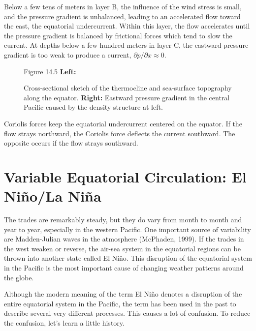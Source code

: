 Below a few tens of meters in layer B, the influence of the wind
stress is small, and the pressure gradient is unbalanced, leading to
an accelerated flow toward the east, the equatorial
undercurrent. Within this layer, the flow accelerates until the
pressure gradient is balanced by frictional forces which tend to slow
the current. At depths below a few hundred meters in layer C, the
eastward pressure gradient is too weak to produce a current,
$\partial p / \partial x \approx 0$.

\begin{figure}[t!]
\footnotesize
Figure 14.5 \textbf{Left:} \rule{0pt}{3ex}Cross-sectional sketch of
the thermocline and sea-surface
topography along the equator.  \textbf{Right:} Eastward pressure
gradient in the central Pacific caused by the density structure at
left.
\label{fig:equatorsketch}
\vspace{-4ex}
\end{figure}

Coriolis forces keep the equatorial undercurrent centered on the
equator. If the flow strays northward, the Coriolis force deflects the
current southward.  The opposite occurs if the flow strays southward.

\section[El Ni\~{n}o]{Variable Equatorial Circulation: El Ni\~{n}o/La
Ni\~{n}a} The trades are remarkably steady, but they do
vary from month to month and year to year, especially in the western
Pacific. One important source of variability are Madden-Julian waves
in the atmosphere (McPhaden, 1999). If the trades in the west weaken
or reverse, the air-sea system in the equatorial regions can be thrown
into another state called El Ni\~{n}o. This disruption of the
equatorial system in the Pacific is the most important cause of
changing weather patterns around the globe.

Although the modern meaning of the term El Ni\~{n}o denotes a
disruption of the entire equatorial system in the Pacific, the term
has been used in the past to describe several very different
processes. This causes a lot of confusion. To reduce the confusion,
let's learn a little history.

